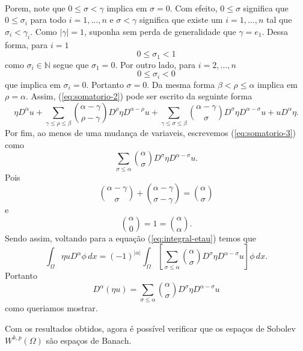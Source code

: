 \documentclass[a4paper, 11pt]{book}
\theoremstyle{definition}
\newcommand{\bN}{\mathbb{N}}
\begin{document}
\begin{prf}
\begin{equation}
\begin{aligned}
           \end{aligned}
    \end{equation}
    Porem, note que $0 \leqslant \sigma < \gamma$ implica em $\sigma = 0$. Com efeito, $0 \leqslant \sigma$ significa que $0 \leqslant \sigma_i$ para todo $i = 1,\dots,n$ e $\sigma < \gamma$ significa que existe um $i = 1,\dots,n$ tal que $\sigma_i < \gamma_i$. Como $|\gamma| = 1$, suponha sem perda de generalidade que $\gamma = e_1$.
    Dessa forma, para $i = 1$
    \[
        0 \leqslant \sigma_1 < 1
    \]
    como $\sigma_i \in \bN$ segue que $\sigma_1 = 0$. Por outro lado, para $i = 2,\dots,n$
    \[
        0 \leqslant \sigma_i < 0
    \]
    que implica em $\sigma_i = 0$. Portanto $\sigma = 0$.
    Da mesma forma $\beta < \rho \leqslant \alpha$ implica em $\rho =\alpha$.
    Assim, (\ref{eq:somatorio-2}) pode ser escrito da seguinte forma
    \begin{equation} \label{eq:somatorio-3}
        \eta D^{\alpha} u + \sum_{\gamma \leqslant \rho \leqslant \beta} \binom{\alpha - \gamma}{\rho - \gamma} D^{\rho}\eta D^{\alpha - \rho} u + \sum_{\gamma \leqslant \sigma \leqslant \beta} \binom{\alpha - \gamma}{\sigma} D^{\sigma} \eta D^{\alpha - \sigma} u + 
        u D^{\alpha}\eta.
    \end{equation}
    Por fim, ao menos de uma mudança de variaveis, escrevemos (\ref{eq:somatorio-3}) como
    \[
        \sum_{\sigma \leqslant \alpha} \binom{\alpha}{\sigma} D^{\sigma} \eta D^{\alpha - \sigma} u.
    \]
    Pois
    \[
        \binom{\alpha - \gamma}{\sigma} + \binom{\alpha - \gamma}{\sigma - \gamma} = \binom{\alpha}{\sigma}
    \]
    e
    \[
        \binom{\alpha}{0} = 1 = \binom{\alpha}{\alpha}.
    \]
    Sendo assim, voltando para a equação (\ref{eq:integral-etau}) temos que
    \[
        \int_\Omega \eta u D^{\alpha}\phi \, dx = (-1)^{|\alpha|} \int_\Omega \left[\sum_{\sigma \leqslant \alpha} \binom{\alpha}{\sigma} D^{\sigma} \eta D^{\alpha - \sigma} u\right] \phi \,dx.
    \]
    Portanto
    \[
        D^\alpha (\eta u) = \sum_{\sigma \leqslant \alpha} \binom{\alpha}{\sigma} D^{\sigma} \eta D^{\alpha - \sigma} u
    \]
    como queriamos mostrar.
\end{prf}

Com os resultados obtidos, agora é possível verificar que os espaços de Sobolev $W^{k,p}(\Omega)$ são espaços de Banach.
\end{document}
